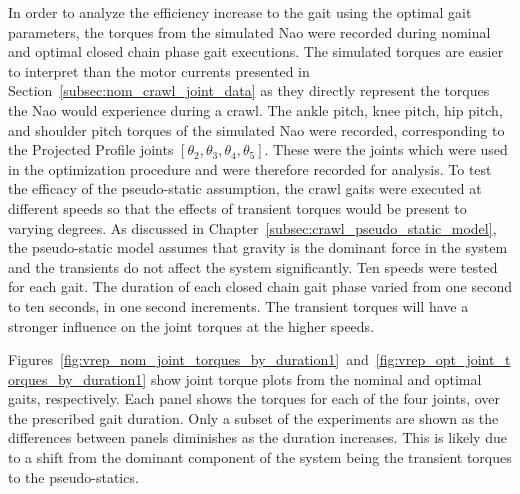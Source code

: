 In order to analyze the efficiency increase to the gait using the optimal gait parameters,
the torques from the simulated Nao were recorded during nominal and optimal closed chain
phase gait executions. The simulated torques are easier to interpret than the motor currents
presented in Section~\ref{subsec:nom_crawl_joint_data} as they directly represent the torques
the Nao would experience during a crawl. The ankle pitch, knee pitch, hip pitch, and shoulder pitch
torques of the simulated Nao were recorded, corresponding to the Projected Profile joints 
$[\theta_2, \theta_3, \theta_4, \theta_5]$. These were the joints which were used in the optimization
procedure and were therefore recorded for analysis.
To test the efficacy of the pseudo-static assumption, the crawl gaits were executed at different
speeds so that the effects of transient torques would be present to varying degrees.
As discussed in Chapter~\ref{subsec:crawl_pseudo_static_model}, the pseudo-static
model assumes that gravity is the dominant force in the system and the  transients
do not affect the system significantly.
Ten speeds were tested for each gait. The duration of each closed chain gait phase varied from one second to
ten seconds, in one second increments. The transient torques will have a stronger influence
on the joint torques at the higher speeds.

Figures~\ref{fig:vrep_nom_joint_torques_by_duration1}~and~\ref{fig:vrep_opt_joint_torques_by_duration1}
show joint torque plots from the nominal and optimal gaits, respectively.
Each panel shows the torques for each of the four joints, over the prescribed gait duration.
Only a subset of the experiments are shown as the differences between panels diminishes
as the duration increases. This is likely due to a shift from the dominant component 
of the system being the transient torques to the pseudo-statics.

